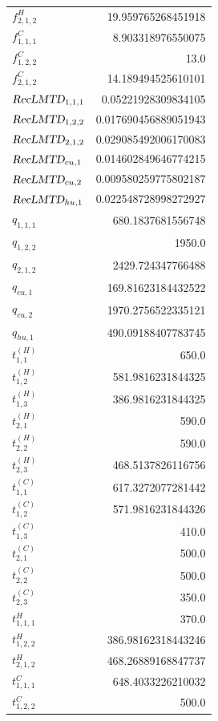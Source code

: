 \documentclass{article}%
\begin{document}
\begin{multicols*}{3}
\begin{supertabular}{lr}
	$f_{2,1,2}^{H}$ & 19.959765268451918 \\%
	$f_{1,1,1}^{C}$ & 8.903318976550075 \\%
	$f_{1,2,2}^{C}$ & 13.0 \\%
	$f_{2,1,2}^{C}$ & 14.189494525610101 \\%
	$\textsl{RecLMTD}_{1,1,1}$ & 0.05221928309834105 \\%
	$\textsl{RecLMTD}_{1,2,2}$ & 0.017690456889051943 \\%
	$\textsl{RecLMTD}_{2,1,2}$ & 0.029085492006170083 \\%
	$\textsl{RecLMTD}_{cu,1}$ & 0.014602849646774215 \\%
	$\textsl{RecLMTD}_{cu,2}$ & 0.009580259775802187 \\%
	$\textsl{RecLMTD}_{hu,1}$ & 0.022548728998272927 \\%
	$q_{1,1,1}$ & 680.1837681556748 \\%
	$q_{1,2,2}$ & 1950.0 \\%
	$q_{2,1,2}$ & 2429.724347766488 \\%
	$q_{cu,1}$ & 169.81623184432522 \\%
	$q_{cu,2}$ & 1970.2756522335121 \\%
	$q_{hu,1}$ & 490.09188407783745 \\%
	$t_{1,1}^{(H)}$ & 650.0 \\%
	$t_{1,2}^{(H)}$ & 581.9816231844325 \\%
	$t_{1,3}^{(H)}$ & 386.9816231844325 \\%
	$t_{2,1}^{(H)}$ & 590.0 \\%
	$t_{2,2}^{(H)}$ & 590.0 \\%
	$t_{2,3}^{(H)}$ & 468.5137826116756 \\%
	$t_{1,1}^{(C)}$ & 617.3272077281442 \\%
	$t_{1,2}^{(C)}$ & 571.9816231844326 \\%
	$t_{1,3}^{(C)}$ & 410.0 \\%
	$t_{2,1}^{(C)}$ & 500.0 \\%
	$t_{2,2}^{(C)}$ & 500.0 \\%
	$t_{2,3}^{(C)}$ & 350.0 \\%
	$t_{1,1,1}^{H}$ & 370.0 \\%
	$t_{1,2,2}^{H}$ & 386.98162318443246 \\%
	$t_{2,1,2}^{H}$ & 468.26889168847737 \\%
	$t_{1,1,1}^{C}$ & 648.4033226210032 \\%
	$t_{1,2,2}^{C}$ & 500.0 \\%

\end{supertabular}
\end{multicols*}
\end{document}
